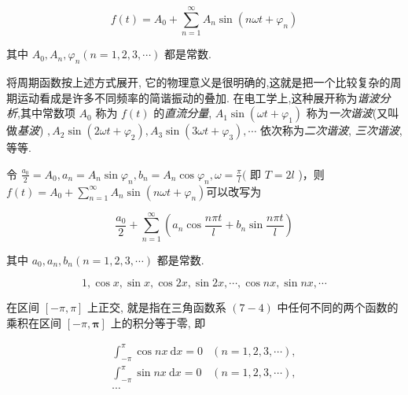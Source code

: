 $$ f(t)=A_{0}+\sum_{n=1}^{\infty} A_{n} \sin \left(n \omega t+\varphi_{n}\right) $$

其中 $ A_{0}, A_{n}, \varphi_{n}(n=1,2,3, \cdots) $ 都是常数.

将周期函数按上述方式展开, 它的物理意义是很明确的,这就是把一个比较复杂的周期运动看成是许多不同频率的简谐振动的叠加. 在电工学上,这种展开称为\textit{谐波分析},其中常数项 $ A_{0} $ 称为 $ f(t) $ 的\textit{直流分量}, $ A_{1} \sin \left(\omega t+\varphi_{1}\right) $ 称为\textit{一次谐波}(又叫做\textit{基波}) $ , A_{2} \sin \left(2 \omega t+\varphi_{2}\right), A_{3} \sin \left(3 \omega t+\varphi_{3}\right), \cdots $ 依次称为\textit{二次谐波}, \textit{三次谐波},等等.

\begin{definition}[三角级数]
    令 $ \frac{a_{0}}{2}=A_{0}, a_{n}=A_{n} \sin \varphi_{n}, b_{n}=A_{n} \cos \varphi_{n}, \omega=\frac{\pi}{l}( $ 即 $ T=2 l $ )，则$ f(t)=A_{0}+\sum_{n=1}^{\infty} A_{n} \sin \left(n \omega t+\varphi_{n}\right) $可以改写为

    $$ \frac{a_{0}}{2}+\sum_{n=1}^{\infty}\left(a_{n} \cos \frac{n \pi t}{l}+b_{n} \sin \frac{n \pi t}{l}\right) $$

    其中 $ a_{0}, a_{n}, b_{n}(n=1,2,3, \cdots) $ 都是常数. 
\end{definition}

\begin{definition}[三角函数系]
    $$ 1, \cos x, \sin x, \cos 2 x, \sin 2 x, \cdots, \cos n x, \sin n x, \cdots $$

    在区间 $ [-\pi, \pi] $ 上正交, 就是指在三角函数系 $ (7-4) $ 中任何不同的两个函数的 乘积在区间 $ [-\pi, \boldsymbol{\pi}] $ 上的积分等于零, 即

    $$ \begin{array}{ll}\int_{-\pi}^{\pi} \cos n x \mathrm{~d} x=0 & (n=1,2,3, \cdots), \\ \int_{-\pi}^{\pi} \sin n x \mathrm{~d} x=0 & (n=1,2,3, \cdots),\\ \cdots
    \end{array} $$
\end{definition}

